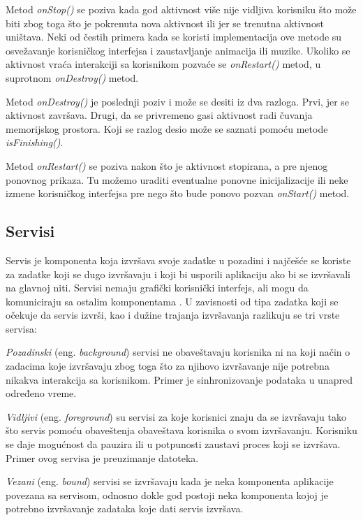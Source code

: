 \documentclass[android.tex]{subfiles}
\begin{document}
Metod \textit{onStop()} se poziva kada god aktivnost više nije vidljiva korisniku što može biti zbog toga što je pokrenuta nova aktivnost ili jer se trenutna aktivnost uništava. Neki od čestih primera kada se koristi implementacija ove metode su osvežavanje korisničkog interfejsa i zaustavljanje animacija ili muzike. Ukoliko se aktivnost vraća interakciji sa korisnikom pozvaće se \textit{onRestart()} metod, u suprotnom \textit{onDestroy()} metod.

Metod \textit{onDestroy()} je poslednji poziv i može se desiti iz dva razloga. Prvi, jer se aktivnost završava. Drugi, da se privremeno gasi aktivnost radi čuvanja memorijskog prostora. Koji se razlog desio može se saznati pomoću metode \textit{isFinishing()}.

Metod \textit{onRestart() }se poziva nakon što je aktivnost stopirana, a pre njenog ponovnog prikaza. Tu možemo uraditi eventualne ponovne inicijalizacije ili neke izmene korisničkog interfejsa pre nego što bude ponovo pozvan \textit{onStart()} metod.

\subsection{Servisi}
Servis je komponenta koja izvršava svoje zadatke u pozadini i najčešće se koriste za zadatke koji se dugo izvršavaju i koji bi usporili aplikaciju ako bi se izvršavali na glavnoj niti. Servisi nemaju grafički korisnički interfejs, ali mogu da komuniciraju sa ostalim komponentama \cite{book:hellman}. U zavisnosti od tipa zadatka koji se očekuje da servis izvrši, kao i dužine trajanja izvršavanja razlikuju se tri vrste servisa:
\begin{description}
    \item \textit{Pozadinski} (eng. \textit{background}) servisi ne obaveštavaju korisnika ni na koji način o zadacima koje izvršavaju zbog toga što za njihovo izvršavanje nije potrebna nikakva interakcija sa korisnikom. Primer je sinhronizovanje podataka u unapred određeno vreme.  
    \item \textit{Vidljivi} (eng. \textit{foreground}) su servisi za koje korisnici znaju da se izvršavaju tako što servis pomoću obaveštenja obaveštava korisnika o svom izvršavanju. Korisniku se daje mogućnost da pauzira ili u potpunosti zaustavi proces koji se izvršava. Primer ovog servisa je preuzimanje datoteka.
    \item \textit{Vezani} (eng. \textit{bound}) servisi se izvršavaju kada je neka komponenta aplikacije povezana sa servisom, odnosno dokle god postoji neka komponenta kojoj je potrebno izvršavanje zadataka koje dati servis izvršava.
\end{description}
\end{document}
